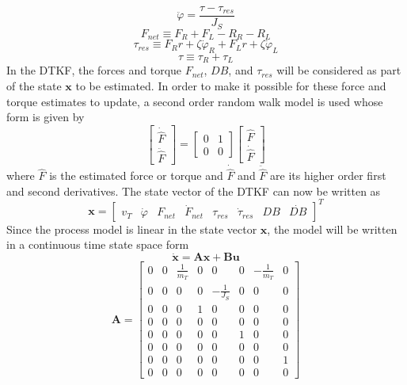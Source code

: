 \begin{equation}
    \label{eq:DTKF_WBSD}
    \ddot \varphi = \frac{\tau - \tau_{res}}{J_S}
\end{equation}
\begin{equation}
    F_{net} \equiv F_R + F_L - R_R - R_L
\end{equation}
\begin{equation}
    \tau_{res} \equiv F_Rr + \zeta\dot\varphi_R + F_Lr + \zeta\dot\varphi_L
\end{equation}
\begin{equation}
    \tau \equiv \tau_R + \tau_L
\end{equation}
In the DTKF, the forces and torque $F_{net}$, $DB$, and $\tau_{res}$ will be considered as part of the state $\mathbf{x}$ to be estimated. In order to make it possible for these force and torque estimates to update, a second order random walk model is used whose form is given by
\begin{equation}
    \begin{bmatrix} \dot{\hat{F}} \\ \ddot{\hat{F}} \end{bmatrix} = \begin{bmatrix} 0 & 1 \\ 0 & 0 \end{bmatrix} \begin{bmatrix} \hat{F} \\ \dot{\hat{F}} \end{bmatrix}
\end{equation}
where $\hat{F}$ is the estimated force or torque and $\dot{\hat{F}}$ and $\ddot{\hat{F}}$ are its higher order first and second derivatives. The state vector of the DTKF can now be written as
\begin{equation*}
    \mathbf{x} = \begin{bmatrix} v_T & \dot\varphi & F_{net} & \dot{F}_{net} & \tau_{res} & \dot\tau_{res} & DB & \dot{DB} \end{bmatrix}^T
\end{equation*}
Since the process model is linear in the state vector $\mathbf{x}$, the model will be written in a continuous time state space form
\begin{equation}\label{eq:CTSS}
    \dot{\mathbf{x}} = \mathbf{A}\mathbf{x} + \mathbf{B}\mathbf{u}
\end{equation}
\begin{equation}
    \mathbf{A} = \begin{bmatrix} 0 & 0 & \frac{1}{m_T} & 0 & 0 & 0 & -\frac{1}{m_T} & 0\\
     0 & 0 & 0 & 0 & -\frac{1}{J_S} & 0 & 0 & 0 \\
     0 & 0 & 0 & 1 & 0 & 0 & 0 & 0 \\
     0 & 0 & 0 & 0 & 0 & 0 & 0 & 0\\
     0 & 0 & 0 & 0 & 0 & 1 & 0 & 0\\
     0 & 0 & 0 & 0 & 0 & 0 & 0 & 0 \\
     0 & 0 & 0 & 0 & 0 & 0 & 0 & 1 \\
     0 & 0 & 0 & 0 & 0 & 0 & 0 & 0\end{bmatrix}
\end{equation}
